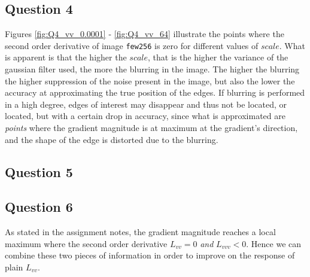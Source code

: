 \subsection{Question 4}

Figures \ref{fig:Q4_vv_0.0001} - \ref{fig:Q4_vv_64} illustrate the points where the second order derivative of image \texttt{few256} is zero for different
values of $scale$. What is apparent is that the higher the $scale$, that is the higher the variance of the gaussian filter used, the more the blurring 
in the image. The higher the blurring the higher suppression of the noise present in the image, but also the lower the accuracy at approximating
the true position of the edges. If blurring is performed in a high degree, edges of interest may disappear and thus not be located,
or located, but with a certain drop in accuracy, since what is approximated are \textit{points} where the gradient magnitude is at maximum at the gradient's direction,
and the shape of the edge is distorted due to the blurring.


\subsection{Question 5}


\subsection{Question 6}

As stated in the assignment notes, the gradient magnitude reaches a local maximum where the second order derivative $L_{vv} = 0$ \textit{and} $L_{vvv} < 0$.
Hence we can combine these two pieces of information in order to improve on the response of plain $L_{vv}$.
